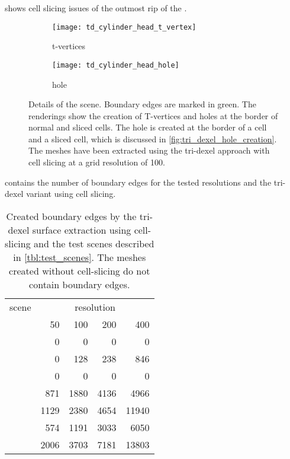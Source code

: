  shows cell slicing issues of the outmost rip of the \cylinderhead.

\begin{figure}
	\centering
	\begin{subfigure}[b]{0.49\textwidth}
		\centering
		\texttt{[image: td\_cylinder\_head\_t\_vertex]}
		\caption{t-vertices}
		\label{fig:td_cylinder_head_t_vertex}
	\end{subfigure}
	\begin{subfigure}[b]{0.49\textwidth}
		\centering
		\texttt{[image: td\_cylinder\_head\_hole]}
		\caption{hole}
		\label{fig:td_cylinder_head_hole}
	\end{subfigure}
	\caption{
		Details of the \cylinderhead scene.
		Boundary edges are marked in green.
		The renderings show the creation of T-vertices and holes at the border of normal and sliced cells.
		The hole is created at the border of a cell and a sliced cell, which is discussed in \cref{fig:tri_dexel_hole_creation}.
		The meshes have been extracted using the tri-dexel approach with cell slicing at a grid resolution of 100.
	}
	\label{fig:td_cylinder_head_issues}
\end{figure}

 contains the number of boundary edges for the tested resolutions and the tri-dexel variant using cell slicing.

\begin{table}
	\centering
	\begin{tabular}{l|r|r|r|r}
		scene          & \multicolumn{4}{c}{resolution} \\
		&   50 &  100 &  200 &   400 \\
		\midrule
		\cubes        &    0 &    0 &    0 &     0 \\
		\cylindersd   &    0 &  128 &  238 &   846 \\
		\cylinders    &    0 &    0 &    0 &     0 \\
		\cylinderhead &  871 & 1880 & 4136 &  4966 \\
		\impeller     & 1129 & 2380 & 4654 & 11940 \\
		\impellerhalf &  574 & 1191 & 3033 &  6050 \\
		\turbine      & 2006 & 3703 & 7181 & 13803 \\
	\end{tabular}
	\caption{
		Created boundary edges by the tri-dexel surface extraction using cell-slicing and the test scenes described in \cref{tbl:test_scenes}.
		The meshes created without cell-slicing do not contain boundary edges.
	}
	\label{tbl:tri_dexel_boundary edges}
\end{table}


